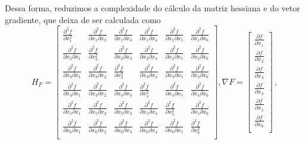 Dessa forma, reduzimos a complexidade do cálculo da matriz hessiana e do vetor gradiente, que deixa de ser calculada como 
%
\begin{equation}
  H_F =
  \begin{bmatrix}
    \frac{\partial^2 f}{\partial x_1^2} & 
    \frac{\partial^2 f}{\partial x_1 \partial x_2}& 
    \frac{\partial^2 f}{\partial x_1 \partial x_3}&  
    \frac{\partial^2 f}{\partial x_1 \partial x_4}&  
    \frac{\partial^2 f}{\partial x_1 \partial x_5}&  
    \frac{\partial^2 f}{\partial x_1 \partial x_6}\\

    \frac{\partial^2 f}{\partial x_2 \partial x_1}&
    \frac{\partial^2 f}{\partial x_2^2}&
    \frac{\partial^2 f}{\partial x_2 \partial x_3}& 
    \frac{\partial^2 f}{\partial x_2 \partial x_4}& 
    \frac{\partial^2 f}{\partial x_2 \partial x_5}& 
    \frac{\partial^2 f}{\partial x_2 \partial x_6}\\

    \frac{\partial^2 f}{\partial x_3 \partial x_1}&
    \frac{\partial^2 f}{\partial x_3 \partial x_2}&
    \frac{\partial^2 f}{\partial x_3^2}& 
    \frac{\partial^2 f}{\partial x_3 \partial x_4}&
    \frac{\partial^2 f}{\partial x_3 \partial x_5}&
    \frac{\partial^2 f}{\partial x_3 \partial x_6}\\

    \frac{\partial^2 f}{\partial x_4 \partial x_1}&
    \frac{\partial^2 f}{\partial x_4 \partial x_2}&
    \frac{\partial^2 f}{\partial x_4 \partial x_3}&
    \frac{\partial^2 f}{\partial x_4^2}&
    \frac{\partial^2 f}{\partial x_4 \partial x_5}&
    \frac{\partial^2 f}{\partial x_4 \partial x_6}\\

    \frac{\partial^2 f}{\partial x_5 \partial x_1}&
    \frac{\partial^2 f}{\partial x_5 \partial x_2}&
    \frac{\partial^2 f}{\partial x_5 \partial x_3}&
    \frac{\partial^2 f}{\partial x_5 \partial x_4}&
    \frac{\partial^2 f}{\partial x_5^2}&
    \frac{\partial^2 f}{\partial x_5 \partial x_6}\\

    \frac{\partial^2 f}{\partial x_6 \partial x_1}&
    \frac{\partial^2 f}{\partial x_6 \partial x_2}&
    \frac{\partial^2 f}{\partial x_6 \partial x_3}&
    \frac{\partial^2 f}{\partial x_6 \partial x_4}&
    \frac{\partial^2 f}{\partial x_6 \partial x_5}&
    \frac{\partial^2 f}{\partial x_6^2}\\
  \end{bmatrix}
  , \nabla F =
  \begin{bmatrix}
    \frac{\partial f}{\partial x_1}\\
    \frac{\partial f}{\partial x_2}\\
    \frac{\partial f}{\partial x_3}\\
    \frac{\partial f}{\partial x_4}\\
    \frac{\partial f}{\partial x_5}\\
    \frac{\partial f}{\partial x_6}\\
  \end{bmatrix} \,,
\end{equation}
